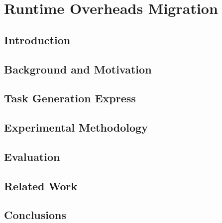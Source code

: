 \newcommand{\proposal}{TaskGenX}
\chapter{Runtime Overheads Migration}
\section{Introduction}
\label{sec:intro}



\section{Background and Motivation}
\label{sec:background}


\section{Task Generation Express}
\label{sec:ram}



\section{Experimental Methodology}
\label{sec:experimental}


\section{Evaluation}
\label{sec:evaluation}


\section{Related Work}
\label{sec:related}


\section{Conclusions}
\label{sec:conclusions}


